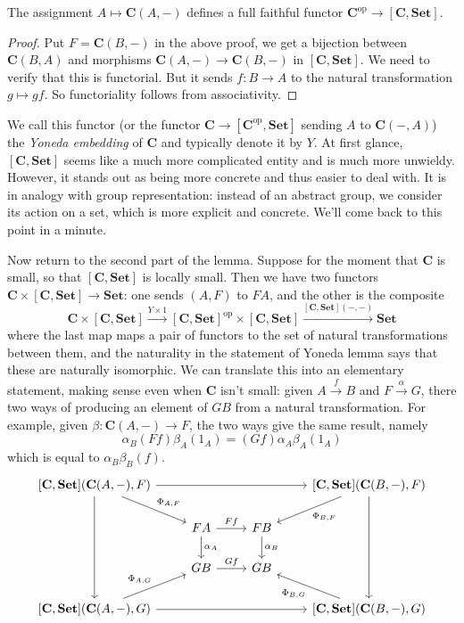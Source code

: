 \documentclass[a4paper]{article}
\renewcommand{\c}[1]{\mathbf{#1}}
\newcommand{\Set}{{\c{Set}}}
\begin{document}
\begin{corollary}
  The assignment \(A \mapsto \c C(A, -)\) defines a full faithful functor \(\c C^{\text{op}} \to [\c C, \Set]\).
\end{corollary}

\begin{proof}
  Put \(F = \c C(B, -)\) in the above proof, we get a bijection between \(\c C(B, A)\) and morphisms \(\c C(A, -) \to \c C(B, -)\) in \([\c C, \Set]\). We need to verify that this is functorial. But it sends \(f: B \to A\) to the natural transformation \(g \mapsto gf\). So functoriality follows from associativity.
\end{proof}

We call this functor (or the functor \(\c C \to [\c C^{\text{op}}, \Set]\) sending \(A\) to \(\c C(-, A)\)) the \emph{Yoneda embedding} of \(\c C\) and typically denote it by \(Y\). At first glance, \([\c C, \Set]\) seems like a much more complicated entity and is much more unwieldy. However, it stands out as being more concrete and thus easier to deal with. It is in analogy with group representation: instead of an abstract group, we consider its action on a set, which is more explicit and concrete. We'll come back to this point in a minute.

Now return to the second part of the lemma. Suppose for the moment that \(\c C\) is small, so that \([\c C, \Set]\) is locally small. Then we have two functors \(\c C \times [\c C, \Set] \to \Set\): one sends \((A, F)\) to \(FA\), and the other is the composite
\[
  \c C \times [\c C, \Set]
  \xrightarrow{Y \times 1} [\c C, \Set]^{\text{op}} \times [\c C, \Set]
  \xrightarrow{[\c C, \Set] (-, -)} \Set
\]
where the last map maps a pair of functors to the set of natural transformations between them, and the naturality in the statement of Yoneda lemma says that these are naturally isomorphic. We can translate this into an elementary statement, making sense even when \(\c C\) isn't small: given \(A \xrightarrow{f} B\) and \(F \xrightarrow{\alpha} G\), there two ways of producing an element of \(GB\) from a natural transformation. For example, given \(\beta: \c C(A, -) \to F\), the two ways give the same result, namely
\[
  \alpha_B(Ff) \beta_A (1_A) = (Gf)\alpha_A \beta_A (1_A)
\]
which is equal to \(\alpha_B\beta_B(f)\).
\[
  \begin{tikzcd}
    {[\c C, \Set](\c C(A, -), F)} \ar[rrr] \ar[ddd] \ar[dr, "\Phi_{A, F}"] &&& {[\c C, \Set](\c C(B, -), F)} \ar[ddd] \ar[dl, "\Phi_{B, F}"] \\
    & FA \ar[r, "Ff"] \ar[d, "\alpha_A"] & FB \ar[d, "\alpha_B"] \\
    & GB \ar[r, "Gf"] & GB \\
    {[\c C, \Set](\c C(A, -), G)} \ar[rrr] \ar[ur, "\Phi_{A, G}"] &&& {[\c C, \Set](\c C(B, -), G)} \ar[ul, "\Phi_{B, G}"] \\
  \end{tikzcd}
\]
\end{document}
